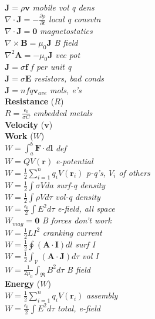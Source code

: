 \documentclass[9pt]{extarticle}
\begin{document}
\begin{multicols}{3}
$\mathbf{J} = \rho\mathbf{v}$ \textit{mobile vol q dens} \\
$\nabla\cdot\mathbf{J} = -\frac{\partial\rho}{\partial t}$ \textit{local q consvtn} \\
$\nabla\cdot\mathbf{J} = \mathbf{0}$ \textit{magnetostatics} \\
$\nabla\times\mathbf{B} = \mu_{0}\mathbf{J}$ \textit{B field} \\
$\nabla^{2}\mathbf{A} = -\mu_{0}\mathbf{J}$ \textit{vec pot} \\
$\mathbf{J} = \sigma\mathbf{f}$ \textit{f per unit q} \\
$\mathbf{J}=\sigma\mathbf{E}$ \textit{resistors, bad conds} \\
$\mathbf{J} = nfq\mathbf{v}_{ave}$ \textit{mols, e's} \\
\textbf{Resistance} ($R$) \\
$R = \frac{\epsilon_{0}}{\sigma C}$ \textit{embedded metals} \\
\textbf{Velocity} ($\mathbf{v}$) \\
\textbf{Work} ($W$)\\
$W = \int_{a}^{b}\mathbf{F}\cdot d\mathbf{l}$ \textit{def} \\
$W = QV(\mathbf{r})$ \textit{e-potential} \\
$W = \frac{1}{2}\sum_{i=1}^{n}q_{i}V(\mathbf{r}_{i})$ \textit{p-q's, $V_{i}$  of others} \\
$W = \frac{1}{2}\int\sigma V da$ \textit{surf-q density} \\
$W = \frac{1}{2}\int\rho V d\tau$ \textit{vol-q density} \\
$W = \frac{\epsilon_{0}}{2}\int E^{2}d\tau $ \textit{e-field, all space} \\
$W_{mag}=\mathbf{0}$ \textit{B forces don't work} \\
$W = \frac{1}{2}LI^{2}$ \textit{cranking current} \\
$W = \frac{1}{2}\oint(\mathbf{A}\cdot\mathbf{I})dl$ \textit{surf I} \\
$W = \frac{1}{2}\int_{\mathcal{V}}(\mathbf{A}\cdot\mathbf{J})d\tau$ \textit{vol I} \\
$W = \frac{1}{2\mu_{0}}\int_{\Re}B^{2}d\tau$ \textit{B field} \\
\textbf{Energy} ($W$) \\
$W = \frac{1}{2}\sum_{i=1}^{n}q_{i}V(\mathbf{r}_{i})$ \textit{assembly} \\
$W = \frac{\epsilon_{0}}{2}\int E^{2}d\tau $ \textit{total, e-field} \\

\end{multicols}
\end{document}
